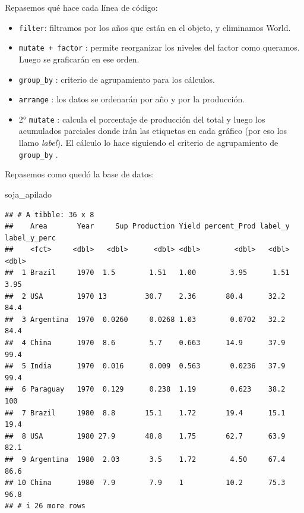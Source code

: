 \documentclass[
]{article}
\newenvironment{Shaded}{\begin{snugshade}}{\end{snugshade}}
\newcommand{\NormalTok}[1]{#1}
\begin{document}
Repasemos qué hace cada línea de código:

\begin{itemize}
\item
  \texttt{filter}: filtramos por los años que están en el objeto, y
  eliminamos World.
\item
  \texttt{mutate\ +\ factor} : permite reorganizar los niveles del
  factor como queramos. Luego se graficarán en ese orden.
\item
  \texttt{group\_by} : criterio de agrupamiento para los cálculos.
\item
  \texttt{arrange} : los datos se ordenarán por año y por la producción.
\item
  2° \texttt{mutate} : calcula el porcentaje de producción del total y
  luego los acumulados parciales donde irán las etiquetas en cada
  gráfico (por eso los llamo \emph{label}). El cálculo lo hace siguiendo
  el criterio de agrupamiento de \texttt{group\_by} .
\end{itemize}

Repasemos como quedó la base de datos:

\begin{Shaded}
\begin{Highlighting}[]
\NormalTok{soja\_apilado}
\end{Highlighting}
\end{Shaded}

\begin{verbatim}
## # A tibble: 36 x 8
##    Area       Year     Sup Production Yield percent_Prod label_y label_y_perc
##    <fct>     <dbl>   <dbl>      <dbl> <dbl>        <dbl>   <dbl>        <dbl>
##  1 Brazil     1970  1.5        1.51   1.00        3.95      1.51         3.95
##  2 USA        1970 13         30.7    2.36       80.4      32.2         84.4 
##  3 Argentina  1970  0.0260     0.0268 1.03        0.0702   32.2         84.4 
##  4 China      1970  8.6        5.7    0.663      14.9      37.9         99.4 
##  5 India      1970  0.016      0.009  0.563       0.0236   37.9         99.4 
##  6 Paraguay   1970  0.129      0.238  1.19        0.623    38.2        100   
##  7 Brazil     1980  8.8       15.1    1.72       19.4      15.1         19.4 
##  8 USA        1980 27.9       48.8    1.75       62.7      63.9         82.1 
##  9 Argentina  1980  2.03       3.5    1.72        4.50     67.4         86.6 
## 10 China      1980  7.9        7.9    1          10.2      75.3         96.8 
## # i 26 more rows
\end{verbatim}
\end{document}
